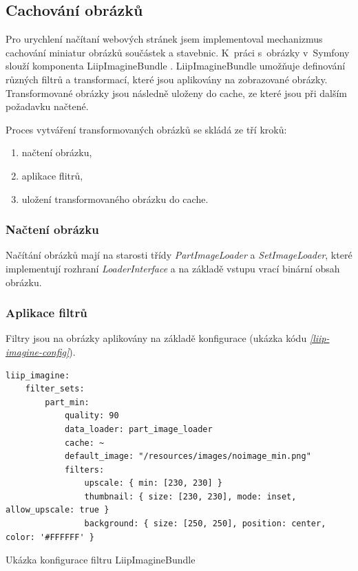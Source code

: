 \subsection{Cachování obrázků}
Pro urychlení načítaní webových stránek jsem implementoval mechanizmus cachování miniatur obrázků součástek a stavebnic. K~práci s~obrázky v~Symfony slouží komponenta LiipImagineBundle \autocite{liipimagine}. LiipImagineBundle umožňuje definování různých filtrů a transformací, které jsou aplikovány na zobrazované obrázky. Transformované obrázky jsou následně uloženy do cache, ze které jsou při dalším požadavku načtené.

Proces vytváření transformovaných obrázků se skládá ze tří kroků:
\begin{enumerate}
    \item načtení obrázku,
    \item aplikace flitrů,
    \item uložení transformovaného obrázku do cache.
\end{enumerate}

\subsubsection*{Načtení obrázku}
Načítání obrázků mají na starosti třídy \textit{PartImageLoader} a \textit{SetImageLoader}, které implementují rozhraní \textit{LoaderInterface} a na základě vstupu vrací binární obsah obrázku. 






\subsubsection*{Aplikace filtrů}
Filtry jsou na obrázky aplikovány na základě konfigurace (ukázka kódu \emph{\ref{liip-imagine-config}}).  

\begin{listing}[htbp]
  \begin{verbatim}
liip_imagine:
    filter_sets:
        part_min:
            quality: 90
            data_loader: part_image_loader
            cache: ~
            default_image: "/resources/images/noimage_min.png"
            filters:
                upscale: { min: [230, 230] }
                thumbnail: { size: [230, 230], mode: inset, allow_upscale: true }
                background: { size: [250, 250], position: center, color: '#FFFFFF' }
  \end{verbatim}
  \caption{Ukázka konfigurace filtru LiipImagineBundle\label{liip-imagine-config}}
\end{listing}



